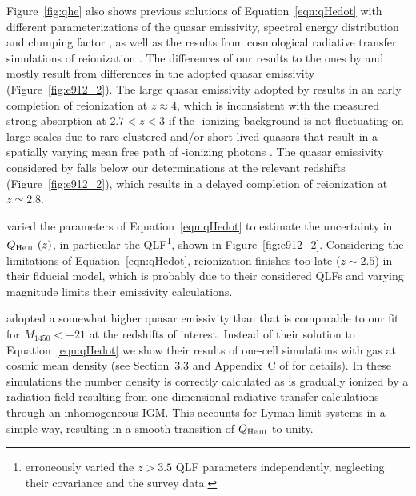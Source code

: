 \documentclass[fleqn,usenatbib]{mnras}
\begin{document}
Figure~\ref{fig:qhe} also shows previous solutions of
Equation~\eqref{eqn:qHedot} with different parameterizations of the
quasar emissivity, spectral energy distribution and clumping factor
\citep{2012ApJ...746..125H, 2015ApJ...813L...8M, 2016ApJ...828...90L,
  2018arXiv180104931P}, as well as the results from cosmological
radiative transfer simulations of  reionization
\citep{2009ApJ...694..842M,2014MNRAS.445.4186C}.  The differences of
our results to the ones by \citet{2012ApJ...746..125H} and
\citet{2015ApJ...813L...8M} mostly result from differences in the
adopted quasar emissivity (Figure~\ref{fig:e912_2}).  The large quasar
emissivity adopted by \citet{2015ApJ...813L...8M} results in an early
completion of  reionization at $z\approx 4$, which is
inconsistent with the measured strong  absorption at
$2.7<z<3$ \citep{2016ApJ...825..144W, 2018MNRAS.473.1416M,
  2018arXiv180104931P} if the -ionizing background is not
fluctuating on large scales due to rare clustered and/or short-lived
quasars that result in a spatially varying mean free path of
-ionizing photons \citep{2010ApJ...714..355F,
  2014MNRAS.440.2406M, 2014MNRAS.437.1141D, 2017MNRAS.465.2886D}.  The
quasar emissivity considered by \citet{2012ApJ...746..125H} falls
below our determinations at the relevant redshifts
(Figure~\ref{fig:e912_2}), which results in a delayed completion of
 reionization at $z\simeq 2.8$.

\citet{2016ApJ...828...90L} varied the parameters of
Equation~\eqref{eqn:qHedot} to estimate the uncertainty in
$Q_\ion{He}{iii}\left(z\right)$, in particular the
QLF\footnote{\citet{2016ApJ...828...90L} erroneously varied the
  $z>3.5$ QLF parameters independently, neglecting their covariance
  and the survey data.}, shown in Figure~\ref{fig:e912_2}.
Considering the limitations of Equation~\eqref{eqn:qHedot},
 reionization finishes too late ($z\sim 2.5$) in their
fiducial model, which is probably due to their considered QLFs and
varying magnitude limits their emissivity calculations.

\citet{2018arXiv180104931P} adopted a somewhat higher quasar
emissivity than \citet{2012ApJ...746..125H} that is comparable to our
fit for $M_{1450}<-21$ at the redshifts of interest.  Instead of their
solution to Equation~\eqref{eqn:qHedot} we show their results of
one-cell simulations with gas at cosmic mean density (see Section~3.3
and Appendix~C of \citealt{2018arXiv180104931P} for details).  In
these simulations the  number density is correctly
calculated as  is gradually ionized by a radiation field
resulting from one-dimensional radiative transfer calculations through
an inhomogeneous IGM.  This accounts for  Lyman limit
systems in a simple way, resulting in a smooth transition of
$Q_\ion{He}{iii}$ to unity.
\end{document}

